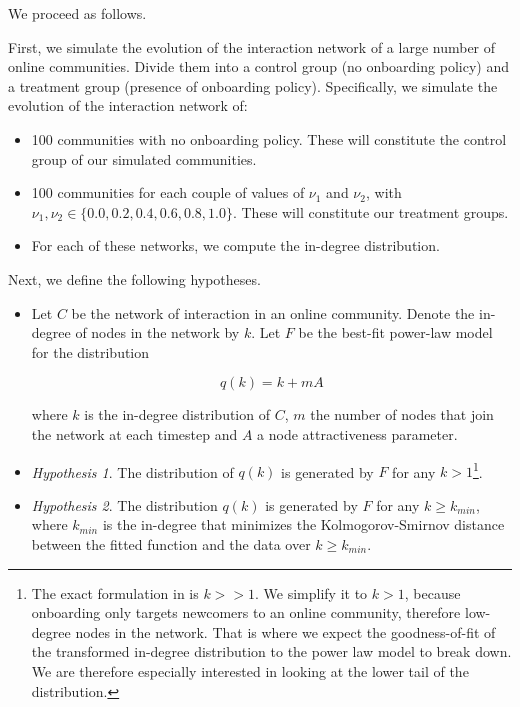 \documentclass{article}
\begin{document}
We proceed as follows.

First, we simulate the evolution of the interaction network of a large number of online communities. Divide them into a control group (no onboarding policy) and a treatment group (presence of onboarding policy). Specifically, we simulate the evolution of the interaction network of:

\begin{itemize}
\item 100 communities with no onboarding policy. These will constitute the control group of our simulated communities. 
\item 100 communities for each couple of values of $\nu_1$  and $\nu_2$, with $\nu_1, \nu_2 \in \{0.0, 0.2, 0.4, 0.6, 0.8, 1.0\}$. These will constitute our treatment groups.
\item For each of these networks, we compute the in-degree distribution.
\end{itemize}

Next, we define the following hypotheses. 


\begin{itemize}
\item Let $C$ be the network of interaction in an online community. Denote the in-degree of nodes in the network by $k$. Let $F$ be the best-fit power-law model for the distribution 

\begin{equation}
\label{eq:tIDD}
 q(k) = k + mA
\end{equation}
 
 where $k$ is the in-degree distribution of $C$, $m$ the number of nodes that join the network at each timestep and $A$ a node attractiveness parameter.
\item \emph{Hypothesis 1}. The distribution of $q(k)$ is generated by $F$ for any $k > 1$\footnote{The exact formulation in \cite{dorogovtsev2002evolution} is $k > > 1$. We simplify it to $k > 1$, because onboarding only targets newcomers to an online community, therefore low-degree nodes in the network. That is where we expect the goodness-of-fit of the transformed in-degree distribution to the power law model to break down. We are therefore especially interested in looking at the lower tail of the distribution.}.
\item \emph{Hypothesis 2}. The distribution $q(k)$ is generated by $F$ for any $k \geq k_{min}$, where $k_{min}$ is the in-degree that minimizes the Kolmogorov-Smirnov distance between the fitted function and the data over $k \geq k_{min}$.
\end{itemize}
\end{document}
